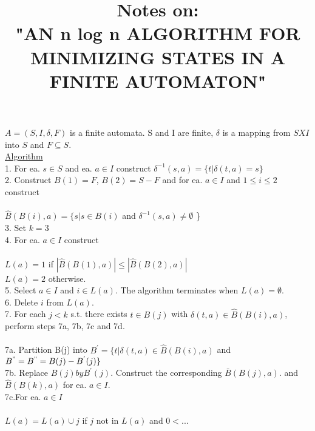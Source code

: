 \documentclass[12pt]{article}
\title{Notes on:\\"AN n log n ALGORITHM FOR MINIMIZING STATES IN A FINITE AUTOMATON"}
\author{}
\date{} %
\begin{document}
\maketitle

$A = (S, I, \delta, F)$ is a finite automata.  S and I are finite, $\delta$ is a mapping from $S X I$ into $S$ and $F \subseteq S$.\\
\underline{Algorithm}\\
1. For ea. $s \in S$ and ea. $a \in I$ construct $\delta^{-1}(s,a) = \{ t | \delta(t,a) = s \}$\\
2. Construct $B(1) = F$, $B(2) = S - F$ and for ea. $a  \in I$ and $1 \le i \le 2$ construct\\
\\ $\hat{B}(B(i), a) = \{ s | s \in B(i)$ and $\delta^{-1}(s,a) \ne \emptyset$   \}\\
3. Set $k = 3$\\
4. For ea. $a \in I$ construct\\
\\  $L(a) = {1}$ if  $| \hat{B}(B(1), a) | \le | \hat{B}(B(2), a) |$\\
 $L(a) = {2}$ otherwise.\\
5. Select $a \in I$ and $i \in L(a)$.  The algorithm terminates when $L(a) = \emptyset$.\\
6. Delete $i$ from $L(a)$.\\
7. For each $j < k$ s.t. there exists $t \in B(j)$ with $\delta(t,a) \in \hat{B}(B(i),a)$, perform steps 7a, 7b, 7c and 7d.\\
\\
7a. Partition B(j) into $B^{'} = \{t | \delta(t,a) \in \hat{B}(B(i), a)$ and $B^{"} = B^{"} = B(j) - B^{'}(j) \}$\\ 
7b. Replace $B(j) by B^{'}(j)$. Construct the corresponding $\bar{B}(B(j), a)$. and $\hat{B}(B(k), a)$ for ea. $a \in I$.\\ 
7c.For ea. $a \in I$\\
\\
$L(a) = L(a) \cup {j}$ if $j$ not in $L(a)$ and $0 < ...$ 
\end{document}
